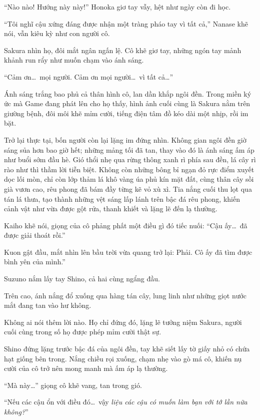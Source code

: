 \documentclass[../main.tex]{subfiles}
\begin{document}
``Nào nào! Hướng này này!'' Honoka giơ tay vẫy, hệt như ngày còn đi học.

``Tôi nghĩ cậu xứng đáng được nhận một tràng pháo tay vì tất cả,'' Nanase khẽ nói, vẫn kiêu kỳ như con người cô.

Sakura nhìn họ, đôi mắt ngân ngấn lệ. Cô khẽ giơ tay, những ngón tay mảnh khảnh run rẩy như muốn chạm vào ánh sáng.

``Cảm ơn\dots\ mọi người. Cảm ơn mọi người\dots\ vì tất cả\dots''

Ánh sáng trắng bao phủ cả thân hình cô, lan dần khắp ngôi đền. Trong miền ký ức mà Game đang phát lên cho họ thấy, hình ảnh cuối cùng là Sakura nằm trên giường bệnh, đôi môi khẽ mỉm cười, tiếng điện tâm đồ kéo dài một nhịp, rồi im bặt.

\ct

Trở lại thực tại, bốn người còn lại lặng im đứng nhìn. Không gian ngôi đền giờ sáng sủa hơn bao giờ hết; những mảng tối đã tan, thay vào đó là ánh sáng ấm áp như buổi sớm đầu hè. Gió thổi nhẹ qua rừng thông xanh rì phía sau đền, lá cây rì rào như thì thầm lời tiễn biệt. Không còn những bông bỉ ngạn đỏ rực điểm xuyết dọc lối mòn, chỉ còn lớp thảm lá khô vàng úa phủ kín mặt đất, cùng thân cây sồi già vươn cao, rêu phong đã bám đầy từng kẽ vỏ xù xì. Tia nắng cuối thu lọt qua tán lá thưa, tạo thành những vệt sáng lấp lánh trên bậc đá rêu phong, khiến cảnh vật như vừa được gột rửa, thanh khiết và lặng lẽ đến lạ thường.


Kaiho khẽ nói, giọng của cô phảng phất một điều gì đó tiếc nuối: ``Cậu ấy\dots\ đã được giải thoát rồi.''

Kuon gật đầu, mắt nhìn lên bầu trời vừa quang trở lại: Phải. Cô ấy đã tìm được bình yên của mình.''

Suzuno nắm lấy tay Shino, cả hai cùng ngẩng đầu.

Trên cao, ánh nắng đổ xuống qua hàng tán cây, lung linh như những giọt nước mắt đang tan vào hư không.

Không ai nói thêm lời nào. Họ chỉ đứng đó, lặng lẽ tưởng niệm Sakura, người cuối cùng trong số họ được phép mỉm cười thật sự.

Shino đứng lặng trước bậc đá của ngôi đền, tay khẽ siết lấy tờ giấy nhỏ có chứa hạt giống bên trong. Nắng chiều rọi xuống, chạm nhẹ vào gò má cô, khiến nụ cười của cô trở nên mong manh mà ấm áp lạ thường.

``Mà này\dots'' giọng cô khẽ vang, tan trong gió.

\begin{center}
  ``Nếu các cậu ổn với điều đó\dots\ vậy \emph{liệu các cậu có muốn làm bạn với tớ lần nữa không?}''
\end{center}
\end{document}
